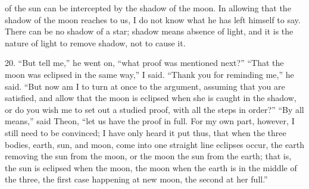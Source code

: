 \documentclass[a4paper, 11pt, oneside, polutonikogreek, english]{article}
\begin{document}
of the sun can be intercepted by the shadow of the moon. In allowing that the shadow of the moon reaches to us, I do not know what he has left himself to say. There can be no shadow of a star; shadow means absence of light, and it is the nature of light to remove shadow, not to cause it.

20. ``But tell me,'' he went on, ``what proof was mentioned next?'' ``That the moon was eclipsed in the same way,'' I said. ``Thank you for reminding me,'' he said. ``But now am I to turn at once to the argument, assuming that you are satisfied, and allow that the moon is eclipsed when she is caught in the shadow, or do you wish me to set out a studied proof, with all the steps in order?'' ``By all means,'' said Theon, ``let us have the proof in full. For my own part, however, I still need to be convinced; I have only heard it put thus, that when the three bodies, earth, sun, and moon, come into one straight line eclipses occur, the earth removing the sun from the moon, or the moon the sun from the earth; that is, the sun is eclipsed when the moon, the moon when the earth is in the middle of the three, the first case happening at new moon, the second at her full.''
\end{document}
